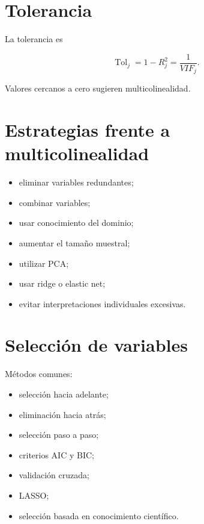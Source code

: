 \documentclass[
  spanish,
  10.5pt,
  letterpaper,
  DIV=11,
  numbers=noendperiod,
  oneside,
  open=any]{scrreprt}
\providecommand{\tightlist}{%
  \setlength{\itemsep}{0pt}\setlength{\parskip}{0pt}}
\theoremstyle{definition}
\theoremstyle{definition}
\theoremstyle{plain}
\theoremstyle{remark}
\begin{document}
\section*{Tolerancia}\label{tolerancia}


La tolerancia es

\[
\operatorname{Tol}_j
=
1-R_j^2
=
\frac{1}{VIF_j}.
\]

Valores cercanos a cero sugieren multicolinealidad.

\section*{Estrategias frente a
multicolinealidad}\label{estrategias-frente-a-multicolinealidad}


\begin{itemize}
\tightlist
\item
  eliminar variables redundantes;
\item
  combinar variables;
\item
  usar conocimiento del dominio;
\item
  aumentar el tamaño muestral;
\item
  utilizar PCA;
\item
  usar ridge o elastic net;
\item
  evitar interpretaciones individuales excesivas.
\end{itemize}

\section*{Selección de variables}\label{selecciuxf3n-de-variables-1}


Métodos comunes:

\begin{itemize}
\tightlist
\item
  selección hacia adelante;
\item
  eliminación hacia atrás;
\item
  selección paso a paso;
\item
  criterios AIC y BIC;
\item
  validación cruzada;
\item
  LASSO;
\item
  selección basada en conocimiento científico.
\end{itemize}
\end{document}
